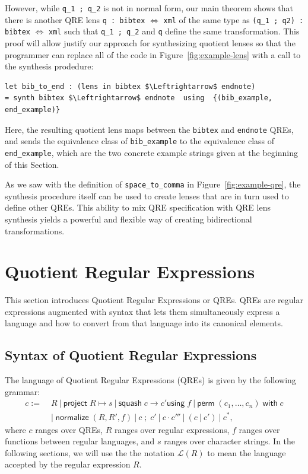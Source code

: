 \documentclass[acmsmall,review,anonymous]{acmart}\settopmatter{printfolios=true,printccs=false,printacmref=false}
\newcommand{\kw}[1]{\ensuremath{\mathsf{#1}}}
\newcommand{\project}[2]{\ensuremath{\kw{project} \; #1 \mapsto #2}}
\newcommand{\squash}[3]{\ensuremath{\kw{squash} \; #1 \rightarrow #2
\kw{using} \; #3}}
\newcommand{\perm}[2]{\ensuremath{\kw{perm}\; (#1)\; \kw{with}\; #2}}
\newcommand{\normalize}[3]{\ensuremath{\kw{normalize} \; (#1, #2, #3)}}
\newcommand{\sep}{\ensuremath{\ | \ }}
\newcommand{\semicolon}{\ensuremath{\; ; \;}}
\newcommand{\cd}[1]{\lstinline[backgroundcolor=\color{white}]$#1$}
\begin{document}
\noindent However, while \cd{q_1 ; q_2} is not in normal form, our main theorem
shows that there is another QRE lens \cd{q : bibtex} $\Leftrightarrow$ \cd{xml}
of the same type as \cd{(q_1 ; q2) : bibtex} $\Leftrightarrow$ \cd{xml} such
that \cd{q_1 ; q_2} and \cd{q} define the same transformation. This proof
will allow justify our approach for synthesizing quotient lenses so that the
programmer can replace all of the code in Figure~\ref{fig:example-lens} with a
call to the synthesis prodedure:

\begin{lstlisting}
let bib_to_end : (lens in bibtex $\Leftrightarrow$ endnote)
= synth bibtex $\Leftrightarrow$ endnote  using  {(bib_example, end_example)}
\end{lstlisting}
\noindent Here, the resulting  quotient lens maps between the \cd{bibtex} and
\cd{endnote} QREs, and sends the equivalence class of \cd{bib_example} to
the equivalence class of \cd{end_example}, which are the two concrete example
strings given at the beginning of this Section.

As we saw with the definition of \cd{space_to_comma} in
Figure~\ref{fig:example-qre}, the synthesis procedure itself can be used to
create lenses that are in turn used to define other QREs.  This ability to mix
QRE specification with QRE lens synthesis yields a powerful and flexible way of
creating bidirectional transformations.

\section{Quotient Regular Expressions}
\label{QRE}

This section introduces Quotient Regular Expressions or QREs. QREs are regular
expressions augmented with syntax that lets them simultaneously express a
language and how to convert from that language into its canonical elements.

\subsection{Syntax of Quotient Regular Expressions}
The language of Quotient Regular Expressions (QREs) is given by the following
grammar:
\begin{align*}
c := \; &R \sep \project{R}{s} \sep \squash{c}{c'}{f} \sep
\perm{c_1, \ldots, c_n}{c} \\
& | \; \normalize{R}{R'}{f} \sep c \semicolon c' \sep c \cdot c''' \sep (c \sep
c') \sep c^*,
\end{align*}
where $c$ ranges over QREs, $R$ ranges over regular expressions, $f$ ranges over
functions between regular languages, and $s$ ranges over character strings. In
the following sections, we will use the the notation $\mathcal{L}(R)$ to mean
the language accepted by the regular expression $R$.
\end{document}
